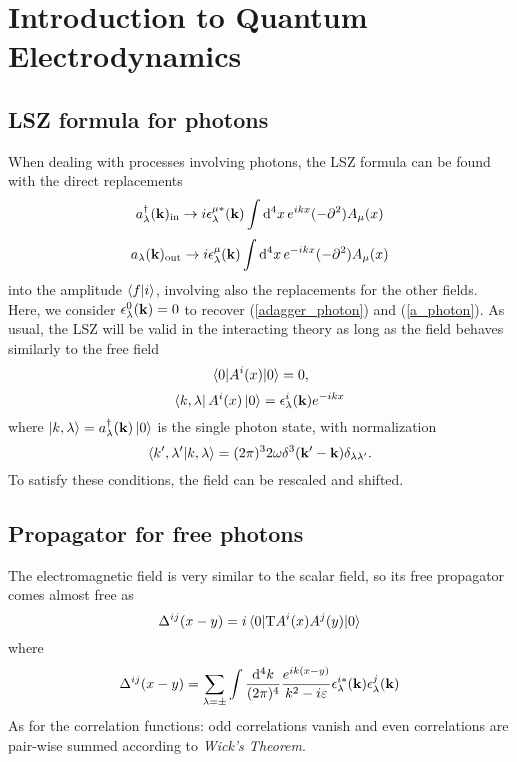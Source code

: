 \chapter{Introduction to Quantum Electrodynamics}
\section{LSZ formula for photons}
When dealing with processes involving photons, the LSZ formula can be found with the direct replacements
\begin{equation}
    a^\dagger_\lambda(\vb{k})_{\text{in}}\to i\epsilon^{\mu*}_{\lambda}(\vb{k})\int\dd^4x\, e^{ikx}(-\partial^2)A_\mu(x)
\end{equation}
\begin{equation}
    a_\lambda(\vb{k})_{\text{out}}\to i\epsilon^{\mu}_{\lambda}(\vb{k})\int\dd^4x\, e^{-ikx}(-\partial^2)A_\mu(x)
\end{equation}
into the amplitude $\braket{f}{i}$, involving also the replacements for the other fields. Here, we consider $\epsilon^0_\lambda(\vb{k})=0$ to recover (\ref{adagger_photon}) and (\ref{a_photon}). As usual, the LSZ will be valid in the interacting theory as long as the field behaves similarly to the free field
\begin{equation}
    \vev{A^i(x)}=0,
\end{equation}
\begin{equation}
    \bra{k,\lambda}A^i(x)\ket{0}=\epsilon_\lambda^i(\vb{k})e^{-ikx}
\end{equation}
where $\ket{k,\lambda}=a^\dagger_\lambda(\vb{k})\ket{0}$ is the single photon state, with normalization
\begin{equation}
    \braket{k^\prime,\lambda^\prime}{k,\lambda}=(2\pi)^32\omega\delta^3(\vb{k}^\prime-\vb{k})\delta_{\lambda\lambda^\prime}.
\end{equation}
To satisfy these conditions, the field can be rescaled and shifted.
\section{Propagator for free photons}
The electromagnetic field is very similar to the scalar field, so its free propagator comes almost free as
\begin{equation}
    \Delta^{ij}(x-y)=i\vev{\text{T}A^i(x)A^j(y)}
\end{equation}
where
\begin{equation}
    \Delta^{ij}(x-y)=\sum_{\lambda=\pm}\int\frac{\dd^4 k}{(2\pi)^4}\frac{e^{ik(x-y)}}{k^2-i\varepsilon}\epsilon^{i*}_\lambda(\vb{k})\epsilon^{j}_\lambda(\vb{k})
\end{equation}
As for the correlation functions: odd correlations vanish and even correlations are pair-wise summed according to \textit{Wick's Theorem}.
